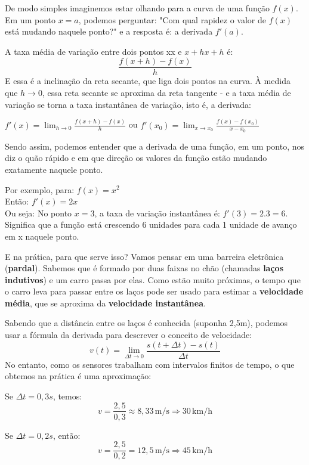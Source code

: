 De modo simples imaginemos estar olhando para a curva de uma função $f(x)$. Em um ponto $x = a$, podemos perguntar: "Com qual rapidez o valor de $f(x)$ está mudando naquele ponto?" e a resposta é: a derivada $f'(a)$.

A taxa média de variação entre dois pontos xx e $x + hx + h$ é:
\[
\frac{f(x + h) - f(x)}{h}
\]	
E essa é a inclinação da reta secante, que liga dois pontos na curva. À medida que $h \longrightarrow 0$, essa reta secante se aproxima da reta tangente - e a taxa média de variação se torna a taxa instantânea de variação, isto é, a derivada:
\begin{center}
	$\displaystyle f'(x) = \lim_{h \to 0} \frac{f(x + h) - f(x)}{h}$
    \hspace{0.5em} ou \hspace{0.5em}
	$\displaystyle f'(x_0) = \lim_{x \to x_0} \frac{f(x) - f(x_0)}{x - x_0}$
\end{center}

Sendo assim, podemos entender que a derivada de uma função, em um ponto, nos diz o quão rápido e em que direção os valores da função estão mudando exatamente naquele ponto.

Por exemplo, para: $f(x) = x^2$ \\
Então: $f'(x) = 2x$ \\
Ou seja: No ponto $x = 3$, a taxa de variação instantânea é: $f'(3) = 2.3 = 6$. Significa que a função está crescendo 6 unidades para cada 1 unidade de avanço em x naquele ponto.

E na prática, para que serve isso? Vamos pensar em uma barreira eletrônica (\textbf{pardal}). Sabemos que é formado por duas faixas no chão (chamadas \textbf{laços indutivos}) e um carro passa por elas. Como estão muito próximas, o tempo que o carro leva para passar entre os laços pode ser usado para estimar a \textbf{velocidade média}, que se aproxima da \textbf{velocidade instantânea}.

Sabendo que a distância entre os laços é conhecida (suponha 2{,}5m), podemos usar a fórmula da derivada para descrever o conceito de velocidade:
\[
v(t) = \lim_{\Delta t \to 0} \frac{s(t + \Delta t) - s(t)}{\Delta t}
\]
No entanto, como os sensores trabalham com intervalos finitos de tempo, o que obtemos na prática é uma aproximação:

Se $\Delta t = 0{,}3s$, temos:
\[
v = \frac{2{,}5}{0{,}3} \approx 8{,}33 \, \text{m/s} \Rightarrow 30 \, \text{km/h}
\]

Se $\Delta t = 0{,}2s$, então:
\[
v = \frac{2{,}5}{0{,}2} = 12{,}5 \, \text{m/s} \Rightarrow 45 \, \text{km/h}
\]

